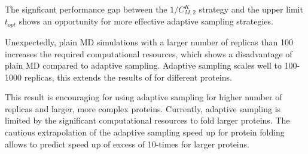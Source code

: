 The signficant performance gap between the $1/C_{M,2}^K$  strategy and the upper limit $t_{opt}$ shows an opportunity for more effective adaptive sampling strategies.

Unexpectedly, plain MD simulations with a larger number of replicas than 100 increases the required computational resources, which shows a disadvantage of plain MD compared to adaptive sampling. Adaptive sampling scales well to 100-1000 replicas, this extends the results of \cite{bowman2010enhanced} for different proteins.  

This result is encouraging for using adaptive sampling for higher number of replicas and larger, more complex proteins. Currently, adaptive sampling is limited by the significant computational resources to fold larger proteins. The cautious extrapolation of the adaptive sampling speed up for protein folding allows to predict speed up of excess of 10-times for larger proteins.











